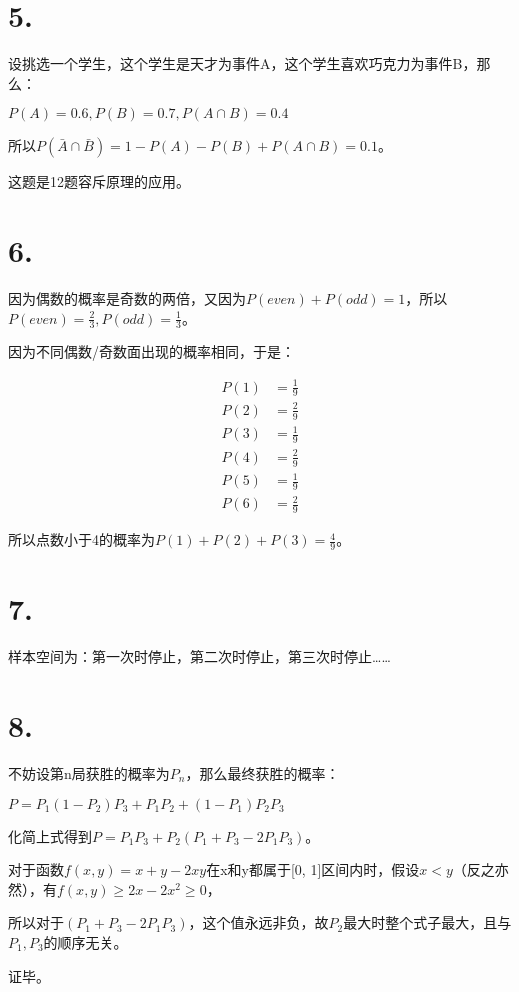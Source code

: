 \documentclass[UTF8]{article}
\begin{document}
    \section*{5.}
        设挑选一个学生，这个学生是天才为事件A，这个学生喜欢巧克力为事件B，那么：

        $P(A) = 0.6, P(B) = 0.7, P(A \cap B) = 0.4$

        所以$P(\bar A \cap \bar B) = 1 - P(A) - P(B) + P(A \cap B) = 0.1$。

        这题是12题容斥原理的应用。
    \section*{6.}
        因为偶数的概率是奇数的两倍，又因为$P(even) + P(odd) = 1$，所以$P(even) = \frac{2}{3}, P(odd) = \frac{1}{3}$。

        因为不同偶数/奇数面出现的概率相同，于是：

        $$\begin{array}{rcl}
            P(1) &= \frac{1}{9} \\
            P(2) &= \frac{2}{9} \\ 
            P(3) &= \frac{1}{9} \\ 
            P(4) &= \frac{2}{9} \\ 
            P(5) &= \frac{1}{9} \\
            P(6) &= \frac{2}{9}
        \end{array}$$

        所以点数小于4的概率为$P(1) + P(2) + P(3) = \frac{4}{9}$。
    \section*{7.}
        样本空间为：第一次时停止，第二次时停止，第三次时停止……
    \section*{8.}
        不妨设第n局获胜的概率为$P_n$，那么最终获胜的概率：
        
        $P = P_1(1 - P_2)P_3 + P_1P_2 + (1 - P_1)P_2P_3$

        化简上式得到$P = P_1P_3 + P_2(P_1 + P_3 - 2P_1P_3)$。

        对于函数$f(x, y) = x + y - 2xy$在x和y都属于[0, 1]区间内时，假设$x < y$（反之亦然），有$f(x, y) \geq 2x - 2x^2 \geq 0$，

        所以对于$(P_1 + P_3 - 2P_1P_3)$，这个值永远非负，故$P_2$最大时整个式子最大，且与$P_1,P_3$的顺序无关。

        证毕。
\end{document}
